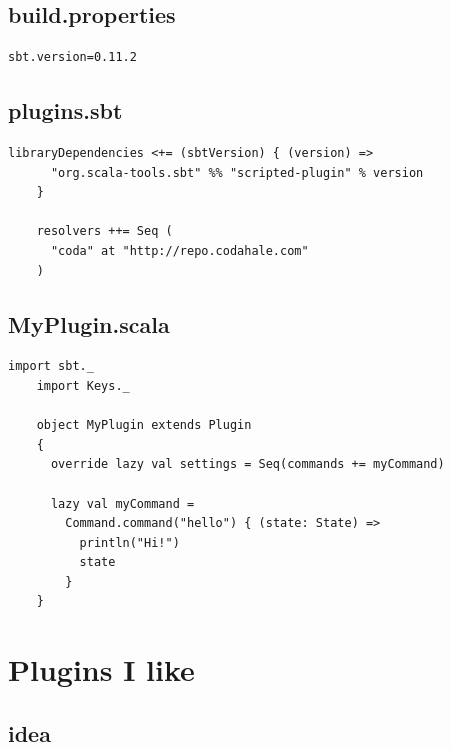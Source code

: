 \documentclass[utf8,utf8x]{beamer}
\begin{document}
\subsection{build.properties}
\begin{frame}[fragile]

  \begin{lstlisting}[title={project/build.properties}]
    sbt.version=0.11.2
  \end{lstlisting}

\end{frame}

\subsection{plugins.sbt}
\begin{frame}[fragile]
  \begin{lstlisting}[title={project/plugins.sbt}]
    libraryDependencies <+= (sbtVersion) { (version) =>
      "org.scala-tools.sbt" %% "scripted-plugin" % version
    }

    resolvers ++= Seq (
      "coda" at "http://repo.codahale.com"
    )
  \end{lstlisting}

\end{frame}

\subsection{MyPlugin.scala}
\begin{frame}[fragile]
  \begin{lstlisting}[title={src/main/scala/MyPlugin.scala}]
    import sbt._
    import Keys._

    object MyPlugin extends Plugin
    {
      override lazy val settings = Seq(commands += myCommand)

      lazy val myCommand = 
        Command.command("hello") { (state: State) =>
          println("Hi!")
          state
        }
    }
  \end{lstlisting}

\end{frame}

\section{Plugins I like}
\frame{\tableofcontents[currentsection]}

\subsection{idea}
\end{document}
